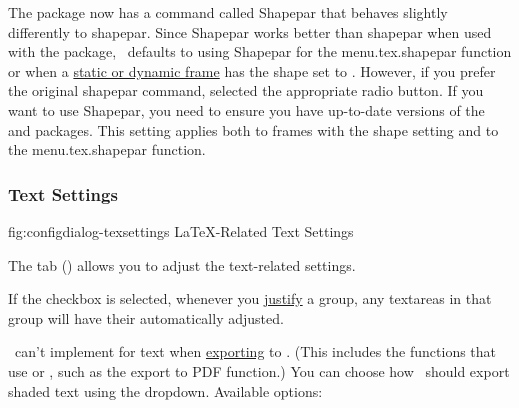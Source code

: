 
The  package now has a command called
\gls{Shapepar} that behaves slightly differently to
\gls{shapepar}. Since \gls{Shapepar} works better than
\gls{shapepar} when used with the  package,
\FlowframTk\ defaults to using \gls{Shapepar} for the
\gls{menu.tex.shapepar} function or when a
\hyperref[sec:flowframe]{static or dynamic frame} has the
shape set to . However, if
you prefer the original \gls{shapepar} command, selected the
appropriate  radio button.
If you want to use \gls{Shapepar}, you need to ensure you have
up-to-date versions of the  and 
packages. This setting applies both to frames with the
 shape setting and to the
\gls{menu.tex.shapepar} function.

\subsubsection{Text Settings}\label{sec:texconfigtext}


\FloatFig
  {fig:configdialog-texsettings}
  {}
  {LaTeX-Related Text Settings}

The  tab
()
allows you to adjust the text-related settings.


If the  \gls{checkbox} is selected,
whenever you \hyperref[sec:alignobjects]{justify} a \gls{group}, any
\glspl{textarea} in that group will have their
 automatically adjusted.


\FlowframTk\ can't implement  for text when
\hyperref[sec:exportpgf]{exporting} to . (This includes the
 functions that use  or , such as
the export to PDF function.) You can choose how \FlowframTk\ should export
shaded text using the 
\gls*{dropdown}. Available options:

